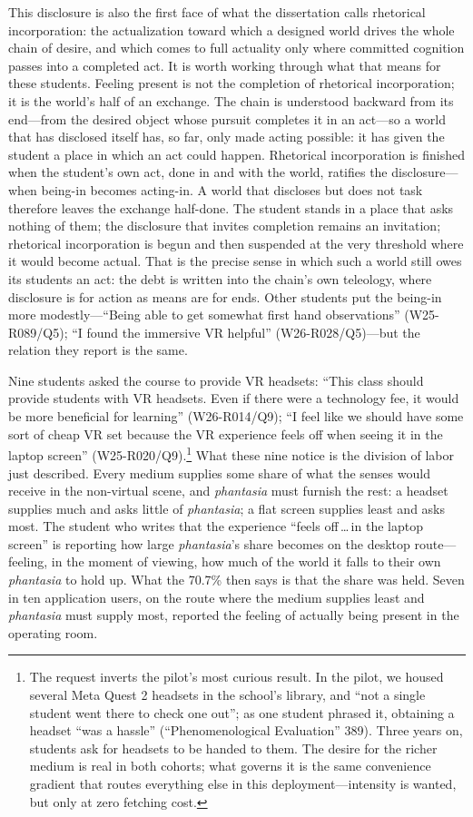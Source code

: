 This disclosure is also the first face of what the dissertation calls
rhetorical incorporation: the actualization toward which a designed
world drives the whole chain of desire, and which comes to full
actuality only where committed cognition passes into a completed act.
It is worth working through what that means for these students. Feeling
present is not the completion of rhetorical incorporation; it is the world's half
of an exchange. The chain is understood backward from its end---from
the desired object whose pursuit completes it in an act---so a world
that has disclosed itself has, so far, only made acting possible: it
has given the student a place in which an act could happen. Rhetorical
incorporation is finished when the student's own act, done in and with
the world, ratifies the disclosure---when being-in becomes acting-in. A
world that discloses but does not task therefore leaves the exchange
half-done. The student stands in a place that asks nothing of them; the
disclosure that invites completion remains an invitation; rhetorical
incorporation is begun and then suspended at the very threshold where it
would become actual. That is the precise sense in which such a world still owes its
students an act: the debt is written into the chain's own teleology,
where disclosure is for action as means are for ends. Other students
put the being-in more modestly---``Being able to get somewhat first
hand observations'' (W25-R089/Q5); ``I found the immersive VR helpful''
(W26-R028/Q5)---but the relation they report is the same.

Nine students asked the course to provide VR headsets: ``This class
should provide students with VR headsets. Even if there were a technology
fee, it would be more beneficial for learning'' (W26-R014/Q9); ``I feel
like we should have some sort of cheap VR set because the VR experience
feels off when seeing it in the laptop screen''
(W25-R020/Q9).\footnote{The request inverts the pilot's most curious
result. In the pilot, we housed several Meta Quest 2 headsets in the
school's library, and ``not a single student went there to check one
out''; as one student phrased it, obtaining a headset ``was a hassle''
(``Phenomenological Evaluation'' 389). Three years on, students ask for
headsets to be handed to them. The desire for the richer medium is real
in both cohorts; what governs it is the same convenience gradient that
routes everything else in this deployment---intensity is wanted, but only
at zero fetching cost.} What these nine notice is the division of labor
just described. Every medium supplies some share of what the senses would
receive in the non-virtual scene, and \textit{phantasia} must furnish the
rest: a headset supplies much and asks little of \textit{phantasia}; a
flat screen supplies least and asks most. The student who writes that the
experience ``feels off\,\ldots\,in the laptop screen'' is reporting how
large \textit{phantasia}'s share becomes on the desktop route---feeling,
in the moment of viewing, how much of the world it falls to their own
\textit{phantasia} to hold up. What the 70.7\% then says is that the
share was held. Seven in ten application users, on the route where the
medium supplies least and \textit{phantasia} must supply most, reported
the feeling of actually being present in the operating room.

